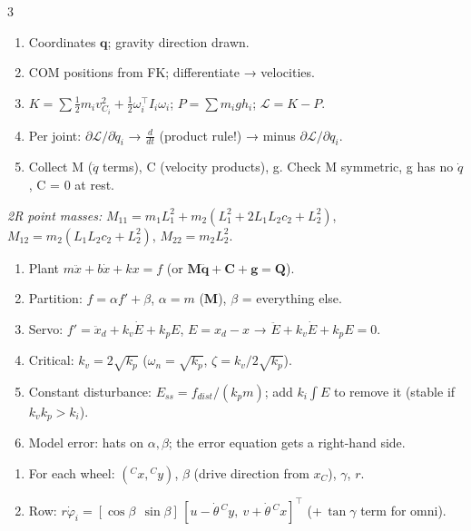 \begin{multicols}{3}
\columnbreak
\begin{recipe}\label{r:lag}
\begin{enumerate}
\item Coordinates $\mathbf q$; gravity direction drawn.
\item COM positions from FK; differentiate → velocities.
\item $K=\sum\frac12 m_i v_{C_i}^2+\frac12\omega_i^\top I_i\omega_i$; $P=\sum m_igh_i$; $\mathcal L=K-P$.
\item Per joint: $\partial\mathcal L/\partial\dot q_i$ → $\frac{d}{dt}$ (product rule!) → minus $\partial\mathcal L/\partial q_i$.
\item Collect M ($\ddot q$ terms), C (velocity products), g. Check M symmetric, g has no $\dot q$, C = 0 at rest.
\end{enumerate}
\textit{2R point masses:} $M_{11}=m_1L_1^2+m_2(L_1^2+2L_1L_2c_2+L_2^2)$, $M_{12}=m_2(L_1L_2c_2+L_2^2)$, $M_{22}=m_2L_2^2$.
\end{recipe}
\begin{recipe}\label{r:ctrl}
\begin{enumerate}
\item Plant $m\ddot x+b\dot x+kx=f$ (or $\mathbf M\ddot{\mathbf q}+\mathbf C+\mathbf g=\mathbf Q$).
\item Partition: $f=\alpha f'+\beta$, $\alpha=m$ ($\mathbf M$), $\beta$ = everything else.
\item Servo: $f'=\ddot x_d+k_v\dot E+k_pE$, $E=x_d-x$ → $\ddot E+k_v\dot E+k_pE=0$.
\item Critical: $k_v=2\sqrt{k_p}$ ($\omega_n=\sqrt{k_p}$, $\zeta=k_v/2\sqrt{k_p}$).
\item Constant disturbance: $E_{ss}=f_{dist}/(k_pm)$; add $k_i\!\int\!E$ to remove it (stable if $k_vk_p>k_i$).
\item Model error: hats on $\alpha,\beta$; the error equation gets a right-hand side.
\end{enumerate}
\end{recipe}
\begin{recipe}\label{r:wheel}
\begin{enumerate}
\item For each wheel: $({}^Cx,{}^Cy)$, $\beta$ (drive direction from $x_C$), $\gamma$, $r$.
\item Row: $r\dot\varphi_i=[\cos\beta\ \ \sin\beta]\,[u-\dot\theta\,{}^Cy,\ v+\dot\theta\,{}^Cx]^\top$ (+\,$\tan\gamma$ term for omni).

\end{enumerate}
\end{recipe}
\end{multicols}
